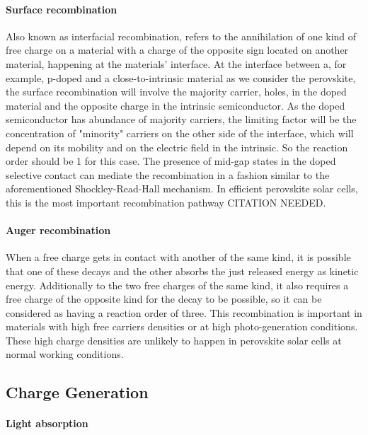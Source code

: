 		\paragraph{Surface recombination}\label{intro_surface_recombination}
		Also known as interfacial recombination, refers to the annihilation of one kind of free charge on a material with a charge of the opposite sign located on another material, happening at the materials' interface.
		At the interface between a, for example, p-doped and a close-to-intrinsic material as we consider the perovskite, the surface recombination will involve the majority carrier, holes, in the doped material and the opposite charge in the intrinsic semiconductor.
		As the doped semiconductor has abundance of majority carriers, the limiting factor will be the concentration of "minority" carriers on the other side of the interface, which will depend on its mobility and on the electric field in the intrinsic.
		So the reaction order should be 1 for this case.
		The presence of mid-gap states in the doped selective contact can mediate the recombination in a fashion similar to the aforementioned Shockley-Read-Hall mechanism.
		In efficient perovskite solar cells, this is the most important recombination pathway CITATION NEEDED.

		\paragraph{Auger recombination}
		When a free charge gets in contact with another of the same kind, it is possible that one of these decays and the other absorbs the just released energy as kinetic energy.
		Additionally to the two free charges of the same kind, it also requires a free charge of the opposite kind for the decay to be possible, so it can be considered as having a reaction order of three.
		This recombination is important in materials with high free carriers densities or at high photo-generation conditions.
		These high charge densities are unlikely to happen in perovskite solar cells at normal working conditions.

	\subsection{Charge Generation}

		\paragraph{Light absorption}

